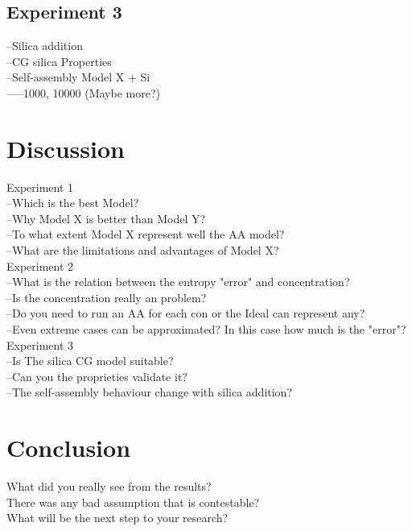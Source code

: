 \documentclass[10pt,a4paper,twoside]{article}
\begin{document}
\subsection{Experiment 3}
 --Silica addition\\
  --CG silica Properties \\
  --Self-assembly Model X + Si\\
   -----1000, 10000 (Maybe more?)\\
\section{Discussion}
\label{subsec:discexp2}

Experiment 1\\
 --Which is the best Model?\\
 --Why Model X is better than Model Y?\\
 --To what extent Model X represent well the AA model?\\
 --What are the limitations and advantages of Model X?\\
Experiment 2\\
 --What is the relation between the entropy "error" and concentration? \\
 --Is the concentration really an problem?\\
 --Do you need to run an AA for each con or the Ideal can represent any?\\
 --Even extreme cases can be approximated? In this case how much is the "error"?\\
Experiment 3\\
 --Is The silica CG model suitable? \\
 --Can you the proprieties validate it?\\
 --The self-assembly behaviour change with silica addition?\\

\section{Conclusion}

 What did you really see from the results?\\
 There was any bad assumption that is contestable?\\
 What will be the next step to your research? \\
 
\end{document}
